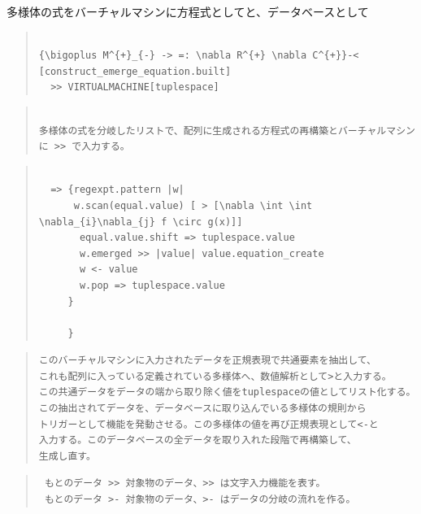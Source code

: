 \documentclass{jsarticle}
\begin{document}
{多様体の式をバーチャルマシンに方程式としてと、データベースとして
\begin{quote}
\setlength{\baselineskip}{12pt}
\begin{verbatim}

{\bigoplus M^{+}_{-} -> =: \nabla R^{+} \nabla C^{+}}-< [construct_emerge_equation.built]
  >> VIRTUALMACHINE[tuplespace] 

\end{verbatim}
\end{quote}

\begin{quote}
\setlength{\baselineskip}{12pt}
\begin{verbatim}

多様体の式を分岐したリストで、配列に生成される方程式の再構築とバーチャルマシン
に >> で入力する。

\end{verbatim}
\end{quote}

\begin{quote}
\setlength{\baselineskip}{12pt}
\begin{verbatim}

  => {regexpt.pattern |w|
      w.scan(equal.value) [ > [\nabla \int \int \nabla_{i}\nabla_{j} f \circ g(x)]]
       equal.value.shift => tuplespace.value
       w.emerged >> |value| value.equation_create 
       w <- value
       w.pop => tuplespace.value
     }

     }
\end{verbatim}
\end{quote}

\begin{quote}
\setlength{\baselineskip}{12pt}
\begin{verbatim}
このバーチャルマシンに入力されたデータを正規表現で共通要素を抽出して、
これも配列に入っている定義されている多様体へ、数値解析として>と入力する。
この共通データをデータの端から取り除く値をtuplespaceの値としてリスト化する。
この抽出されてデータを、データベースに取り込んでいる多様体の規則から
トリガーとして機能を発動させる。この多様体の値を再び正規表現として<-と
入力する。このデータベースの全データを取り入れた段階で再構築して、
生成し直す。

\end{verbatim}
\end{quote}
\begin{quote}
\setlength{\baselineskip}{12pt}
\begin{verbatim}
 もとのデータ >> 対象物のデータ、>> は文字入力機能を表す。
 もとのデータ >- 対象物のデータ、>- はデータの分岐の流れを作る。
\end{verbatim}
\end{quote}



}
\end{document}

